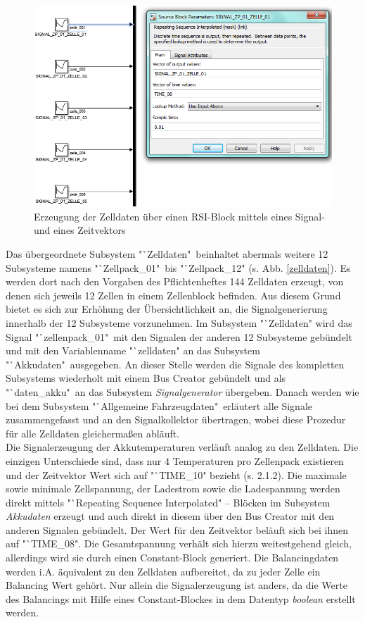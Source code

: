 \documentclass[fontsize = 12pt, paper = a4]{scrreprt}
\begin{document}
\begin{figure}[h]
\centering
\includegraphics[scale = 0.65]{makezelldaten}
\caption[Generierung der Zelldaten]{Erzeugung der Zelldaten über einen RSI-Block mittels eines Signal- und eines Zeitvektors}
\label{makezelldaten}
\end{figure}

\newpage

Das übergeordnete Subsystem "`Zelldaten"\  beinhaltet abermals weitere 12 Subsysteme namens "`Zellpack\_01"\ bis "`Zellpack\_12" (s. Abb. \ref{zelldaten}). Es werden dort nach den Vorgaben des Pflichtenheftes 144 Zelldaten erzeugt, von denen sich jeweils 12 Zellen in einem Zellenblock befinden. Aus diesem Grund bietet es sich zur Erhöhung der Übersichtlichkeit an, die Signalgenerierung innerhalb der 12 Subsysteme vorzunehmen. Im Subsystem "`Zelldaten" wird das Signal "`zellenpack\_01"\ mit den Signalen der anderen 12 Subsysteme gebündelt und mit den Variablenname "`zelldaten" an das Subsystem "`Akkudaten"\  ausgegeben. An dieser Stelle werden die Signale des kompletten Subsystems wiederholt mit einem Bus Creator gebündelt und als "`daten\_akku"\ an das Subsystem \textit{Signalgenerator} übergeben. Danach werden wie bei dem Subsystem "`Allgemeine Fahrzeugdaten"\ erläutert alle Signale zusammengefasst und an den Signalkollektor übertragen, wobei diese Prozedur für alle Zelldaten gleichermaßen abläuft. \\

Die Signalerzeugung der Akkutemperaturen verläuft analog zu den Zelldaten. Die einzigen Unterschiede sind, dass nur 4 Temperaturen pro Zellenpack existieren und der Zeitvektor Wert sich auf "`TIME\_10" bezieht (s. 2.1.2). Die maximale sowie minimale Zellspannung, der Ladestrom sowie die Ladespannung werden direkt mittels "`Repeating Sequence Interpolated" -- Blöcken im Subsystem \textit{Akkudaten} erzeugt und auch direkt in diesem über den Bus Creator mit den anderen Signalen gebündelt. Der Wert für den Zeitvektor beläuft sich bei ihnen auf "`TIME\_08". Die Gesamtspannung verhält sich hierzu weitestgehend  gleich, allerdings wird sie durch einen Constant-Block generiert. Die Balancingdaten werden i.A. äquivalent zu den Zelldaten aufbereitet, da zu jeder Zelle ein Balancing Wert gehört. Nur allein die Signalerzeugung ist anders, da die Werte des Balancings mit Hilfe eines Constant-Blockes in dem Datentyp \textit{boolean} erstellt werden. \\
\end{document}
